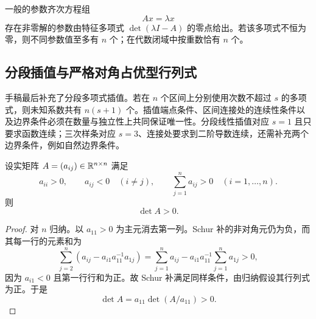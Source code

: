 \begin{remark}
一般的参数齐次方程组
\begin{equation}
 A x=\lambda x
\end{equation}
存在非零解的参数由特征多项式 $\det(\lambda I-A)$ 的零点给出。若该多项式不恒为零，则不同参数值至多有 $n$ 个；在代数闭域中按重数恰有 $n$ 个。
\end{remark}

\subsection{分段插值与严格对角占优型行列式}

手稿最后补充了分段多项式插值。若在 $n$ 个区间上分别使用次数不超过 $s$ 的多项式，则未知系数共有 $n(s+1)$ 个。插值端点条件、区间连接处的连续性条件以及边界条件必须在数量与独立性上共同保证唯一性。分段线性插值对应 $s=1$ 且只要求函数连续；三次样条对应 $s=3$、连接处要求到二阶导数连续，还需补充两个边界条件，例如自然边界条件。

\begin{theorem}[一类 $M$-矩阵判别]
设实矩阵 $A=(a_{ij})\in\mathbb R^{n\times n}$ 满足
\begin{equation}
 a_{ii}>0,
 \qquad a_{ij}<0\quad(i\neq j),
 \qquad \sum_{j=1}^n a_{ij}>0\quad(i=1,\ldots,n).
\end{equation}
则
\begin{equation}
 \det A>0.
\end{equation}
\end{theorem}

\begin{proof}
对 $n$ 归纳。以 $a_{11}>0$ 为主元消去第一列。Schur 补的非对角元仍为负，而其每一行的元素和为
\begin{equation}
 \sum_{j=2}^n\left(a_{ij}-a_{i1}a_{11}^{-1}a_{1j}\right)
 =\sum_{j=1}^n a_{ij}
 -a_{i1}a_{11}^{-1}\sum_{j=1}^n a_{1j}>0,
\end{equation}
因为 $a_{i1}<0$ 且第一行行和为正。故 Schur 补满足同样条件，由归纳假设其行列式为正。于是
\begin{equation}
 \det A=a_{11}\det(A/a_{11})>0.
\end{equation}
\end{proof}
